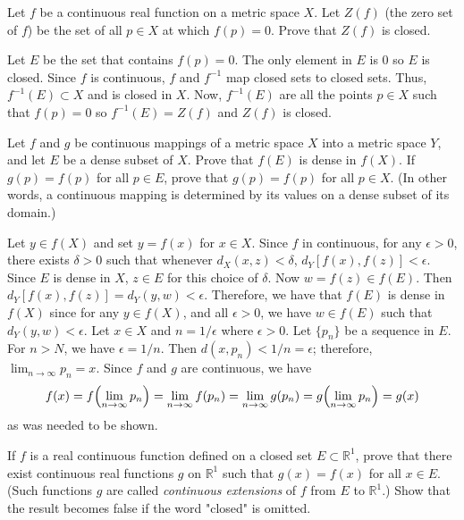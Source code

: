 \begin{exercise}
\item
  \label{4.3}
  Let \(f\) be a continuous real function on a metric space \(X\).
  Let \(Z(f)\) (the zero set of \(f\)) be the set of all \(p\in X\) at which
  \(f(p) = 0\).
  Prove that \(Z(f)\) is closed.
  \par\smallskip
  Let \(E\) be the set that contains \(f(p) = 0\).
  The only element in \(E\) is \(0\) so \(E\) is closed.
  Since \(f\) is continuous, \(f\) and \(f^{-1}\) map closed sets to closed
  sets.
  Thus, \(f^{-1}(E)\subset X\) and is closed in \(X\).
  Now, \(f^{-1}(E)\) are all the points \(p\in X\) such that \(f(p) = 0\) so
  \(f^{-1}(E) = Z(f)\) and \(Z(f)\) is closed.
\item
  \label{4.4}
  Let \(f\) and \(g\) be continuous mappings of a metric space \(X\) into a
  metric space \(Y\), and let \(E\) be a dense subset of \(X\).
  Prove that \(f(E)\) is dense in \(f(X)\).
  If \(g(p) = f(p)\) for all \(p\in E\), prove that \(g(p) = f(p)\) for all
  \(p\in X\).
  (In other words, a continuous mapping is determined by its values on a dense
  subset of its domain.)
  \par\smallskip
  Let \(y\in f(X)\) and set \(y = f(x)\) for \(x\in X\).
  Since \(f\) in continuous, for any \(\epsilon > 0\), there exists
  \(\delta > 0\) such that whenever \(d_X(x,z) < \delta\),
  \(d_Y[f(x),f(z)] < \epsilon\).
  Since \(E\) is dense in \(X\), \(z\in E\) for this choice of \(\delta\).
  Now \(w = f(z)\in f(E)\).
  Then \(d_Y[f(x),f(z)] = d_Y(y,w) < \epsilon\).
  Therefore, we have that \(f(E)\) is dense in \(f(X)\) since for any
  \(y\in f(X)\), and all \(\epsilon > 0\), we have \(w\in f(E)\) such that
  \(d_Y(y,w) < \epsilon\).
  Let \(x\in X\) and \(n = 1/\epsilon\) where \(\epsilon > 0\).
  Let \(\{p_n\}\) be a sequence in \(E\).
  For \(n > N\), we have \(\epsilon = 1/n\).
  Then \(d(x,p_n) < 1/n = \epsilon\); therefore, \(\lim_{n\to\infty}p_n = x\).
  Since \(f\) and \(g\) are continuous, we have
  \[
  f(x) = f\Bigl(\lim_{n\to\infty}p_n\Bigr) = \lim_{n\to\infty}f(p_n)
  = \lim_{n\to\infty}g(p_n) = g\Bigl(\lim_{n\to\infty}p_n\Bigr) = g(x)
  \]
  as was needed to be shown.
\item
  \label{4.5}
  If \(f\) is a real continuous function defined on a closed set
  \(E\subset\mathbb{R}^1\), prove that there exist continuous real functions
  \(g\) on \(\mathbb{R}^1\) such that \(g(x) = f(x)\) for all \(x\in E\).
  (Such functions \(g\) are called \textit{continuous extensions} of \(f\) from
  \(E\) to \(\mathbb{R}^1\).)
  Show that the result becomes false if the word "closed" is omitted.

\end{exercise}
